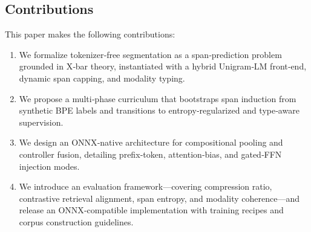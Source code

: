 \subsection{Contributions}

This paper makes the following contributions:
\begin{enumerate}
	\item We formalize tokenizer‐free segmentation as a span‐prediction problem grounded in X‐bar theory, instantiated with a hybrid Unigram‐LM front‐end, dynamic span capping, and modality typing.
	\item We propose a multi‐phase curriculum that bootstraps span induction from synthetic BPE labels and transitions to entropy‐regularized and type‐aware supervision.
	\item We design an ONNX‐native architecture for compositional pooling and controller fusion, detailing prefix‐token, attention‐bias, and gated‐FFN injection modes.
	\item We introduce an evaluation framework—covering compression ratio, contrastive retrieval alignment, span entropy, and modality coherence—and release an ONNX‐compatible implementation with training recipes and corpus construction guidelines.
\end{enumerate}